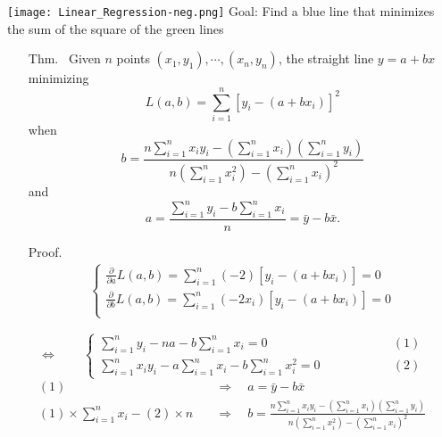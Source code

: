 \begin{frame}
\centering
\texttt{[image: Linear\_Regression-neg.png]}
\vfill
Goal: Find a blue line that minimizes \\
the sum of the square of the green lines
\end{frame}
\begin{frame}
\begin{enumerate}
\item[Thm.~] Given $n$ points $(x_1,y_1),\cdots, (x_n,y_n)$, the straight line $y=a+bx$ minimizing \[
		L(a,b) = \sum_{i=1}^n \left[y_i-(a+bx_i) \right]^2
\]
when
\[
b= \frac{n\sum_{i=1}^n x_iy_i - \left(\sum_{i=1}^n x_i\right)\left(\sum_{i=1}^n y_i\right)}{n\left(\sum_{i=1}^n x_i^2\right)-\left(\sum_{i=1}^n x_i\right)^2}
\]
and
\[
a =  \frac{\sum_{i=1}^ny_i-b\sum_{i=1}^nx_i}{n} = \bar y - b \bar x.
\]
\vfill
\item[Proof.]
\begin{align}
\tag{Normal equations}
\begin{cases}
\displaystyle
\frac{\partial }{\partial a}L(a,b) = \sum_{i=1}^n (-2) \left[y_i-(a+bx_i) \right] = 0\\
\displaystyle
\frac{\partial }{\partial b} L(a,b) = \sum_{i=1}^n (-2x_i) \left[y_i-(a+bx_i) \right] = 0\\
\end{cases}
\end{align}
\end{enumerate}
\end{frame}
\begin{frame}[fragile]
	\[
		\Longleftrightarrow\qquad
\begin{cases}
\displaystyle
\sum_{i=1}^n y_i-n a- b \sum_{i=1}^n x_i = 0& \hspace{5em} (1)\\[1em]
\displaystyle
\sum_{i=1}^n x_iy_i - a \sum_{i=1}^n x_i - b\sum_{i=1}^n x_i^2 =0&\hspace{5em} (2)
\end{cases}
	\]
	\vfill
	\begin{align*}
		(1) & \quad\Longrightarrow \quad a = \bar{y}-b\bar{x}\\[2em]
		(1)\times \sum_{i=1}^n x_i - (2)\times n &\quad\Longrightarrow\quad
	b= \frac{n\sum_{i=1}^n x_iy_i - \left(\sum_{i=1}^n x_i\right)\left(\sum_{i=1}^n y_i\right)}{n\left(\sum_{i=1}^n x_i^2\right)-\left(\sum_{i=1}^n x_i\right)^2}
	\end{align*}
\myEnd
\end{frame}
